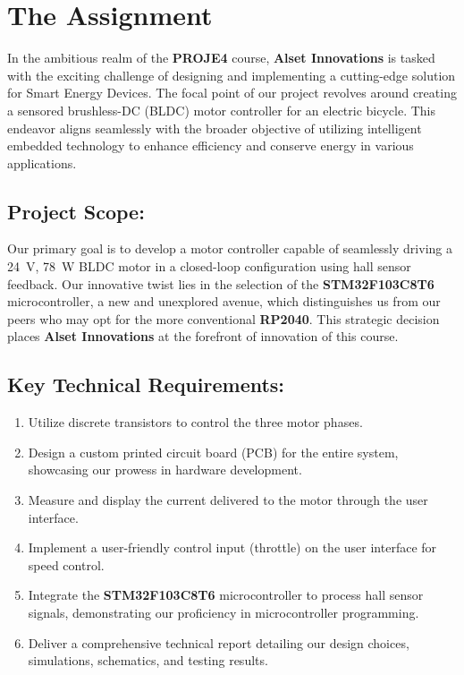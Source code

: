 \section{The Assignment}
In the ambitious realm of the \textbf{PROJE4} course, \textbf{Alset Innovations} is tasked with the exciting challenge of designing and implementing a cutting-edge solution for Smart Energy Devices. The focal point of our project revolves around creating a sensored brushless-DC (BLDC) motor controller for an electric bicycle. This endeavor aligns seamlessly with the broader objective of utilizing intelligent embedded technology to enhance efficiency and conserve energy in various applications.

\subsection{Project Scope:}
Our primary goal is to develop a motor controller capable of seamlessly driving a \SI{24}{\volt}, \SI{78}{\watt} BLDC motor in a closed-loop configuration using hall sensor feedback. Our innovative twist lies in the selection of the \textbf{STM32F103C8T6} microcontroller, a new and unexplored avenue, which distinguishes us from our peers who may opt for the more conventional \textbf{RP2040}. This strategic decision places \textbf{Alset Innovations} at the forefront of innovation of this course.

\subsection{Key Technical Requirements:}
\begin{enumerate}
    \item Utilize discrete transistors to control the three motor phases.
    \item Design a custom printed circuit board (PCB) for the entire system, showcasing our prowess in hardware development.
    \item Measure and display the current delivered to the motor through the user interface.
    \item Implement a user-friendly control input (throttle) on the user interface for speed control.
    \item Integrate the \textbf{STM32F103C8T6} microcontroller to process hall sensor signals, demonstrating our proficiency in microcontroller programming.
    \item Deliver a comprehensive technical report detailing our design choices, simulations, schematics, and testing results.
\end{enumerate}

